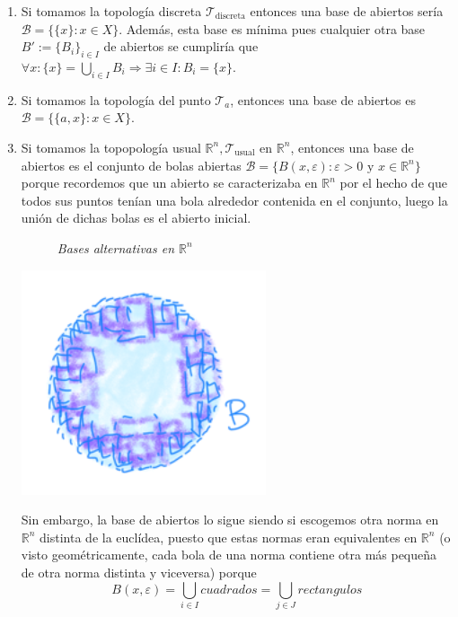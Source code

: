 \begin{ej}
\begin{enumerate}
    \item Si tomamos la topología discreta $\mathcal{T}_{\text{discreta}}$ entonces una base de abiertos sería $\mathcal{B} = \{\{x\} : x \in X\}$. Además, esta base es mínima pues cualquier otra base $B' := \{B_i\}_{i\in I}$ de abiertos se cumpliría que $\forall x  : \{x\} = \bigcup_{i \in  I} B_i \Rightarrow \exists i \in I : B_i = \{x\}$.
    \item Si tomamos la topología del punto $\mathcal{T}_a$, entonces una base de abiertos es $\mathcal{B} = \{\{a, x\} : x \in X\}$.
    \item Si tomamos la topopología usual $\mathbb{R}^n, \mathcal{T}_{\text{usual}}$ en $\mathbb{R}^n$, entonces una base de abiertos es el conjunto de bolas abiertas $\mathcal{B} = \{B\left( x, \varepsilon \right) : \varepsilon > 0 \mbox{ y } x \in \mathbb{R}^n\}$ porque recordemos que un abierto se caracterizaba en $\mathbb{R}^n$ por el hecho de que todos sus puntos tenían una bola alrededor contenida en el conjunto, luego la unión de dichas bolas es el abierto inicial.
\begin{figure}[H]
    \centering
    \caption{\textit{Bases alternativas en $\mathbb{R}^n$}}
    \label{fig:bases-alternativas-en-rn}
\end{figure}
    \begin{center}
        \includegraphics[scale=0.3]{images/base_rn} 
    \end{center}
    Sin embargo, la base de abiertos lo sigue siendo si escogemos otra norma en $\mathbb{R}^n$ distinta de la euclídea, puesto que estas normas eran equivalentes en $\mathbb{R}^n$ (o visto geométricamente, cada bola de una norma contiene otra más pequeña de otra norma distinta y viceversa)
    porque
    \[
    B\left( x, \varepsilon \right) = \bigcup_{i \in  I} cuadrados = \bigcup_{j \in J} rectangulos
    \]
\end{enumerate}
\end{ej}

